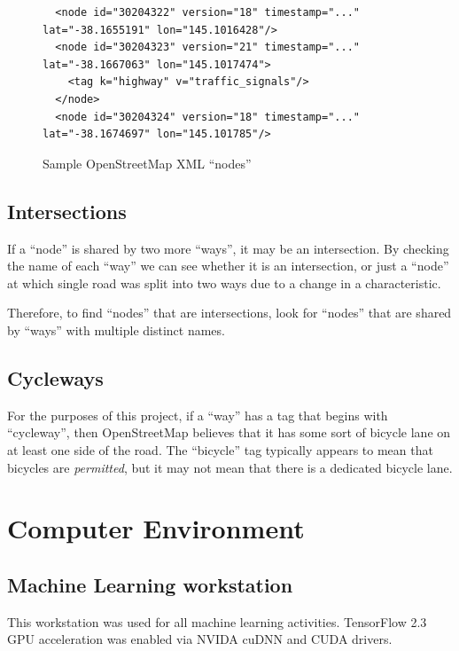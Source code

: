 \documentclass[11pt,twoside]{report}
\begin{document}
\begin{figure}[h]
\centering
\begin{verbatim}
  <node id="30204322" version="18" timestamp="..." lat="-38.1655191" lon="145.1016428"/>
  <node id="30204323" version="21" timestamp="..." lat="-38.1667063" lon="145.1017474">
    <tag k="highway" v="traffic_signals"/>
  </node>
  <node id="30204324" version="18" timestamp="..." lat="-38.1674697" lon="145.101785"/>	
\end{verbatim}
\caption{Sample OpenStreetMap XML ``nodes''}
\label{xml:way_nodes}
\end{figure}

\section{Intersections}
\label{osm:intersections}

If a ``node'' is shared by two more ``ways'', it may be an intersection.  By checking the name of each ``way'' we can see whether it is an intersection, or just a ``node'' at which single road was split into two ways due to a change in a characteristic.

Therefore, to find ``nodes'' that are intersections, look for ``nodes'' that are shared by ``ways'' with multiple distinct names.

\section{Cycleways}
\label{osm:cycleways}

For the purposes of this project, if a ``way'' has a tag that begins with ``cycleway'', then OpenStreetMap believes that it has some sort of bicycle lane on at least one side of the road.  The ``bicycle'' tag typically appears to mean that bicycles are \textit{permitted}, but it may not mean that there is a dedicated bicycle lane.


\chapter{Computer Environment}
\label{a:environment}

\section{Machine Learning workstation}
\label{a:computer}

This workstation was used for all machine learning activities.  TensorFlow 2.3 GPU acceleration was enabled via NVIDA cuDNN and CUDA drivers.
\end{document}
